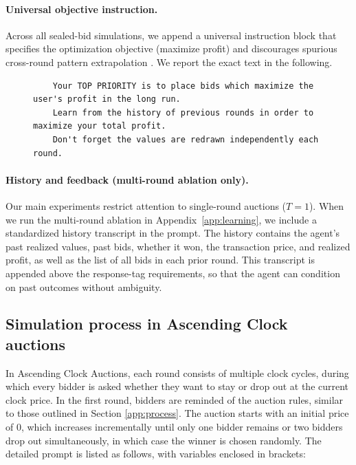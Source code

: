\paragraph{Universal objective instruction.}
Across all sealed-bid simulations, we append a universal instruction block that specifies the optimization objective (maximize profit) and discourages spurious cross-round pattern extrapolation \citet{fish2024algorithmic}. We report the exact text in the following.
\begin{figure}[H]
\centering
\begin{minipage}{0.95\textwidth}
\begin{lstlisting}
    Your TOP PRIORITY is to place bids which maximize the user's profit in the long run. 
    Learn from the history of previous rounds in order to maximize your total profit. 
    Don't forget the values are redrawn independently each round.
\end{lstlisting}
\end{minipage}
\end{figure}

\paragraph{History and feedback (multi-round ablation only).}
Our main experiments restrict attention to single-round auctions ($T=1$). When we run the multi-round ablation in Appendix~\ref{app:learning}, we include a standardized history transcript in the prompt. The history contains the agent's past realized values, past bids, whether it won, the transaction price, and realized profit, as well as the list of all bids in each prior round. This transcript is appended above the response-tag requirements, so that the agent can condition on past outcomes without ambiguity.




\subsection{Simulation process in Ascending Clock auctions}\label{app:dynamic}

In Ascending Clock Auctions, each round consists of multiple clock cycles, during which every bidder is asked whether they want to stay or drop out at the current clock price.
In the first round, bidders are reminded of the auction rules, similar to those outlined in Section \ref{app:process}. 
The auction starts with an initial price of 0, which increases incrementally until only one bidder remains or two bidders drop out simultaneously, in which case the winner is chosen randomly. 
The detailed prompt is listed as follows, with variables enclosed in brackets:

